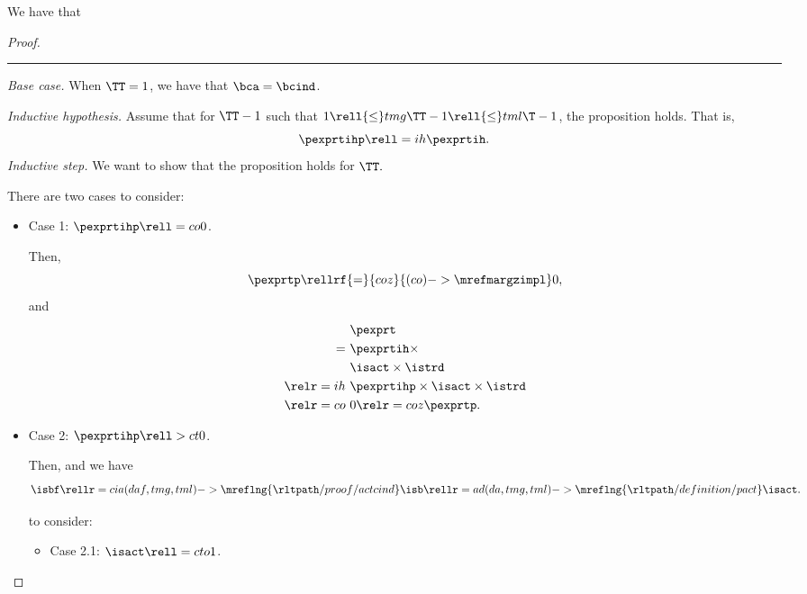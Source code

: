 \begin{proposition}
  We have that %
\end{proposition}

\begin{proof}
  \hrule
  {\it Base case.}
  When $\TT = 1$,
  we have  that
  $\bca = \bcind$.

  \serule
  {\it Inductive hypothesis.}
  Assume that for $\TT - 1$ such that $1 \rell {\le} tmg \TT - 1 \rell {\le} tml \T - 1$,
  the proposition holds. That is,
  $$ \pexprtihp \rell = ih \pexprtih.$$%
  \srule
  {\it Inductive step.}
  We want to show that the proposition holds for $\TT.$

  There are two cases to consider:
  \begin{itemize}
    \item {} Case 1: $\pexprtihp \rell = co 0$. 

      Then,
      $$\pexprtp  \rellrf{=}{coz}{(co)->\mrefmargzimpl} 0,$$
      and
      \begin{align*}
        &\pexprt \\
        =\ &\pexprtih \times \\
        &\isact \times \istrd\\
        \relr = ih \ & \pexprtihp \times \isact \times \istrd \\
        \relr = co \ & 0 \relr = coz \pexprtp.
      \end{align*}
    \item {} Case 2: $\pexprtihp \rell > ct 0$. 

      Then, 
      and we have
      $$\isbf \rellr = cia (daf,tmg,tml)->\mreflng{\rltpath/proof/actcind} \isb 
      \rellr = ad (da,tmg,tml)->\mreflng{\rltpath/definition/pact} \isact.$$

       to consider:
      \begin{itemize}
        \item {} Case 2.1: $\isact \rell = cto 1$.


\end{itemize}
\end{itemize}
\end{proof}
